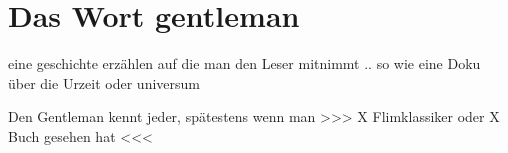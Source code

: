 \chapter{Das Wort \glqq gentleman\grqq}

eine geschichte erzählen auf die man den Leser mitnimmt .. so wie eine Doku über die Urzeit oder universum 


Den Gentleman kennt jeder, spätestens wenn man >>> X Flimklassiker oder X Buch gesehen hat <<<  